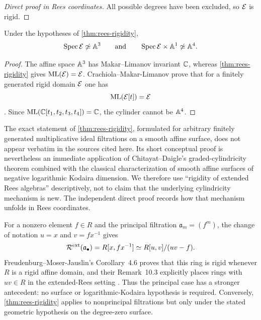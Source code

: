 \begin{proof}[Direct proof in Rees coordinates]
All possible degrees have been excluded, so $\mathcal E$ is rigid.
\end{proof}

\begin{corollary}\label{cor:general-cancellation}
Under the hypotheses of \cref{thm:rees-rigidity},
\[
  \operatorname{Spec} \mathcal E\not\simeq\mathbb A^3
  \qquad\text{and}\qquad
  \operatorname{Spec} \mathcal E\times\mathbb A^1\not\simeq\mathbb A^4.
\]
\end{corollary}

\begin{proof}
The affine space $\mathbb A^3$ has Makar--Limanov invariant $\mathbb C$, whereas \cref{thm:rees-rigidity} gives $\operatorname{ML}(\mathcal E)=\mathcal E$.  Crachiola--Makar-Limanov prove that for a finitely generated rigid domain $\mathcal E$ one has
\[
  \operatorname{ML}(\mathcal E[t])=\mathcal E
\]
\cite[Theorem 3.1]{CrachiolaMakarLimanov2008}.  Since $\operatorname{ML}(\mathbb C[t_1,t_2,t_3,t_4])=\mathbb C$, the cylinder cannot be $\mathbb A^4$.
\end{proof}


\begin{remark}\label{rem:rees-attribution}
The exact statement of \cref{thm:rees-rigidity}, formulated for arbitrary finitely generated multiplicative ideal filtrations on a smooth affine surface, does not appear verbatim in the sources cited here.  Its short conceptual proof is nevertheless an immediate application of Chitayat--Daigle's graded-cylindricity theorem combined with the classical characterization of smooth affine surfaces of negative logarithmic Kodaira dimension.  We therefore use ``rigidity of extended Rees algebras'' descriptively, not to claim that the underlying cylindricity mechanism is new.  The independent direct proof records how that mechanism unfolds in Rees coordinates.
\end{remark}

\begin{remark}\label{rem:principal-rees}
For a nonzero element $f\in R$ and the principal filtration $\mathfrak a_m=(f^m)$, the change of notation $u=x$ and $v=fx^{-1}$ gives
\[
  \mathcal R^{\mathrm{ext}}(\mathfrak a_\bullet)
  =R[x,fx^{-1}]
  \simeq R[u,v]/(uv-f).
\]
Freudenburg--Moser-Jauslin's Corollary~4.6 proves that this ring is rigid whenever $R$ is a rigid affine domain, and their Remark~10.3 explicitly places rings with $uv\in R$ in the extended-Rees setting \cite{FreudenburgMoserJauslin2013}.  Thus the principal case has a stronger antecedent: no surface or logarithmic-Kodaira hypothesis is required.  Conversely, \cref{thm:rees-rigidity} applies to nonprincipal filtrations but only under the stated geometric hypothesis on the degree-zero surface.
\end{remark}

